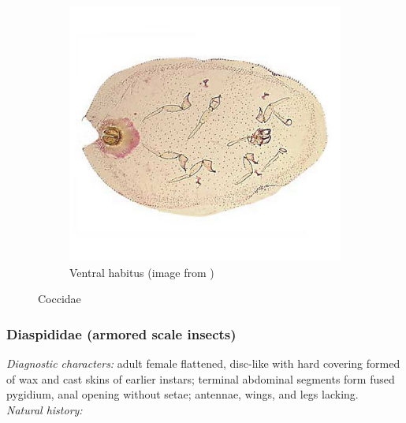 \documentclass[letterpaper, 11pt]{article}
\begin{document}
\begin{figure}[ht!]
\begin{subfigure}[ht!]{0.45\textwidth}
  \includegraphics[width=\textwidth]{CoccidHabitus}
  \caption{Ventral habitus (image from \cite{ScaleNet})}
  \label{fig:coccid2}
 \end{subfigure}
 \caption{Coccidae}\label{fig:coccid}
\end{figure}

\subsubsection{Diaspididae (armored scale insects)}
\noindent{}\textit{Diagnostic characters:} adult female flattened, disc-like with hard covering formed of wax and cast skins of earlier instars; terminal abdominal segments form fused pygidium, anal opening without setae; antennae, wings, and legs lacking.\\

\noindent{}\textit{Natural history:} \\
\end{document}
